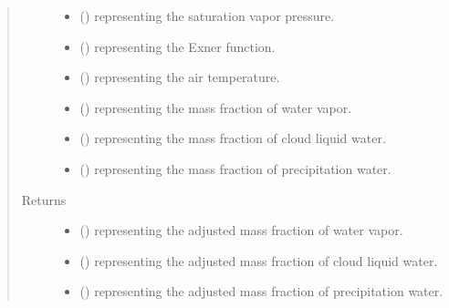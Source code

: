 \documentclass[letterpaper,10pt,english]{sphinxmanual}
\begin{document}
\begin{fulllineitems}
\begin{fulllineitems}
\begin{quote}
\begin{description}
\begin{itemize}
\item {} 
 () \textendash{}  representing the saturation vapor pressure.

\item {} 
 () \textendash{}  representing the Exner function.

\item {} 
 () \textendash{}  representing the air temperature.

\item {} 
 () \textendash{}  representing the mass fraction of water vapor.

\item {} 
 () \textendash{}  representing the mass fraction of cloud liquid water.

\item {} 
 () \textendash{}  representing the mass fraction of precipitation water.

\end{itemize}

\item[{Returns}] \leavevmode
\begin{itemize}
\item {} 
 () \textendash{}  representing the adjusted mass fraction of water vapor.

\item {} 
 () \textendash{}  representing the adjusted mass fraction of cloud liquid water.

\item {} 
 () \textendash{}  representing the adjusted mass fraction of precipitation water.

\end{itemize}


\end{description}\end{quote}

\end{fulllineitems}
\end{fulllineitems}
\end{document}
